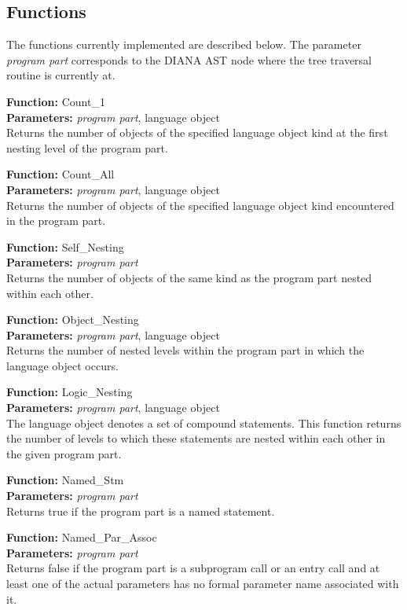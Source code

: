 \subsection{Functions}

The functions currently implemented are described below.  The parameter
{\it program part} corresponds to the DIANA AST node where the tree
traversal routine is currently at.

{\bf Function:} Count\_1\\
{\bf Parameters:} {\it program part}, language object\\
Returns the number of objects of the specified language object
kind at the first nesting level of the program part.

{\bf Function:} Count\_All\\
{\bf Parameters:} {\it program part}, language object\\
Returns the number of objects of the specified language object kind
encountered in the program part.

{\bf Function:} Self\_Nesting\\
{\bf Parameters:} {\it program part}\\
Returns the number of objects of the same kind as
the program part nested within each other.

{\bf Function:} Object\_Nesting\\
{\bf Parameters:} {\it program part}, language object\\
Returns the number of nested levels within the program part in which
the language object occurs.

{\bf Function:} Logic\_Nesting\\
{\bf Parameters:} {\it program part}, language object\\
The language object denotes a set of compound statements.
This function returns the number of levels to which these
statements are nested within each other in the given program part.

{\bf Function:} Named\_Stm\\
{\bf Parameters:} {\it program part}\\
Returns true if the program part is a named statement.

{\bf Function:} Named\_Par\_Assoc\\
{\bf Parameters:} {\it program part}\\
Returns false if the program part is a subprogram
call or an entry call and at least one of the actual
parameters has no formal parameter name associated with
it.

